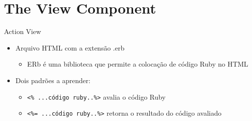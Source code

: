 \section{The View Component}
\begin{frame}[t, fragile]{Action View}
	\begin{itemize}
		\item Arquivo HTML com a extensão \alert{.erb}
		\begin{itemize}
			\item ERb é uma \alert{biblioteca} que permite a colocação de código Ruby no HTML
		\end{itemize}

		\item Dois padrões a aprender:
		\begin{itemize}
			\item  \verb|<% ...código ruby..%>| avalia o código Ruby
			\item  \verb|<%= ...código ruby..%>| retorna o resultado do código avaliado 
		\end{itemize}		
		
	\end{itemize}	
\end{frame}